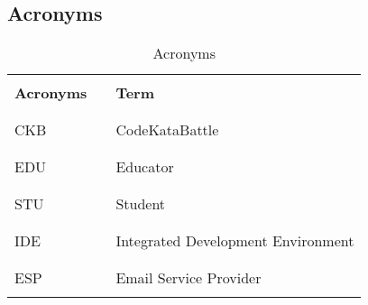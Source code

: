 \subsection{Acronyms}
\begin{table}[H]
    \centering
    \renewcommand{\arraystretch}{0.5}
    \begin{tabular}{l l p{11cm}}
        \hline
                          &        &                                            \\
        \textbf{Acronyms} & \vline & \textbf{Term}                              \\
                          &        &                                            \\\hline & & \\
        CKB               & \vline & CodeKataBattle                             \\
                          &        &                                            \\\hline & & \\
        EDU               & \vline & Educator                                   \\
                          &        &                                            \\\hline & & \\
        STU               & \vline & Student                                    \\
                          &        &                                            \\\hline & & \\
        IDE               & \vline & Integrated Development Environment         \\
                          &        &                                            \\\hline & & \\
        ESP               & \vline & Email Service Provider                     \\
                          &        &                                            \\
        \hline
    \end{tabular}
    \caption{Acronyms}
\end{table}

